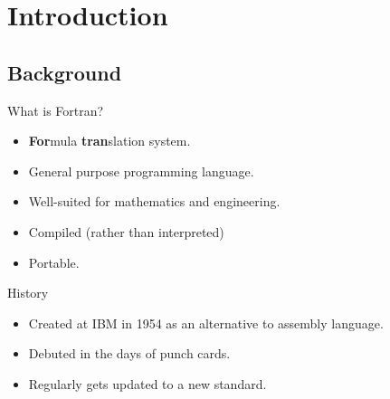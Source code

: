 \section{Introduction}
\makesubcontentsslides


\subsection{Background}

\begin{frame}
  \begin{block}{What is Fortran?}\pause
  \begin{itemize}
    \item \textbf{For}mula \textbf{tran}slation system.
    \item General purpose programming language.
    \item Well-suited for mathematics and engineering.
    \item Compiled (rather than interpreted)
    \item Portable.
  \end{itemize}
  \end{block}
\end{frame}

\begin{frame}
  \begin{block}{History}\pause
  \begin{itemize}
    \item Created at IBM in 1954 as an alternative to assembly language.
    \item Debuted in the days of punch cards.
    \item Regularly gets updated to a new standard.
  \end{itemize}
  \end{block}
\end{frame}

